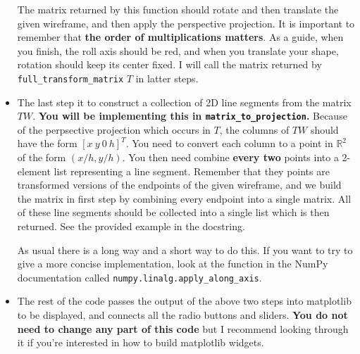 \documentclass{article}
\theoremstyle{remark}
\begin{document}
\begin{itemize}
  The matrix returned by this function should rotate and then translate the given wireframe, and then apply the perspective projection.
  It is important to remember that \textbf{the order of multiplications matters}.
  As a guide, when you finish, the roll axis should be red, and when you translate your shape, rotation should keep its center fixed.
  I will call the matrix returned by \texttt{full\_transform\_matrix} $T$ in latter steps.
\item
  The last step it to construct a collection of 2D line segments from the matrix $TW$.
  \textbf{You will be implementing this in \texttt{matrix\_to\_projection}.}
  Because of the perpsective projection which occurs in $T$, the columns of $TW$ should have the form $[ x \ y \ 0 \ h ]^T$.
  You need to convert each column to a point in $\mathbb R^2$ of the form $(x / h, y / h)$.
  You then need combine \textbf{every two} points into a 2-element list representing a line segment.
  Remember that they points are transformed versions of the endpoints of the given wireframe, and we build the matrix in first step by combining every endpoint into a single matrix.
  All of these line segments should be collected into a single list which is then returned.
  See the provided example in the docstring.

  As usual there is a long way and a short way to do this.
  If you want to try to give a more concise implementation, look at the function in the NumPy documentation called \texttt{numpy.linalg.apply\_along\_axis}.
\item The rest of the code passes the output of the above two steps into matplotlib to be displayed, and connects all the radio buttons and sliders.
  \textbf{You do not need to change any part of this code} but I recommend looking through it if you're interested in how to build matplotlib widgets.
\end{itemize}
\end{document}
